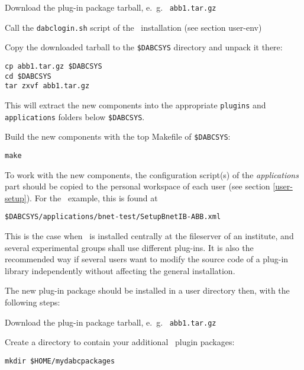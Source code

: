 \bnum
\item Download the plug-in package tarball, e.~g.~ {\tt abb1.tar.gz}

\item Call the {\tt dabclogin.sh} script of the \dabc\ installation (see section user-env)

\item Copy the downloaded tarball to the {\tt \$DABCSYS} directory and unpack it there:
\begin{verbatim}
cp abb1.tar.gz $DABCSYS
cd $DABCSYS
tar zxvf abb1.tar.gz
\end{verbatim} 
This will extract the new components into the appropriate {\tt plugins} and
{\tt applications} folders below {\tt \$DABCSYS}.

\item Build the new components with the top Makefile of {\tt \$DABCSYS}:
\begin{verbatim}
make
\end{verbatim} 

\item To work with the new components, the configuration script(s) of the {\em applications} part should be copied
to the personal workspace of each user (see section \ref{user-setup}).
For the \ABB\ example, this is found at
\begin{verbatim}
$DABCSYS/applications/bnet-test/SetupBnetIB-ABB.xml
\end{verbatim} 
\enum





This is the case when \dabc\ is installed centrally at the fileserver
of an institute, and several experimental groups shall use different plug-ins.
It is also the recommended way if several users 
want to modify the source code of a plug-in library independently without 
affecting the general installation.


The new plug-in package should be installed in a user directory
then, with the following steps:

\bnum
\item Download the plug-in package tarball, e.~g.~ {\tt abb1.tar.gz}

\item Create a directory to contain your additional \dabc\ plugin packages:
\begin{verbatim}
mkdir $HOME/mydabcpackages
\end{verbatim} 


